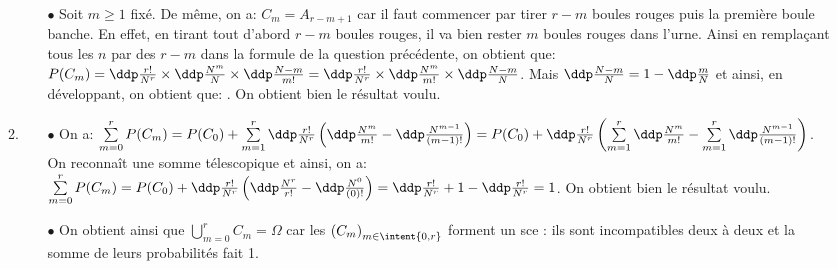 \begin{correction}
\begin{enumerate}
\begin{enumerate}
\begin{itemize}
\item[$\bullet$] Soit $m\geq 1$ fix\'e. De m\^{e}me, on a: $C_m=A_{r-m+1}$ car il faut commencer par tirer $r-m$ boules rouges puis la premi\`{e}re boule banche. En effet, en tirant tout d'abord $r-m$ boules rouges, il va bien rester $m$ boules rouges dans l'urne. Ainsi en rempla\c{c}ant tous les $n$ par des $r-m$ dans la formule de la question pr\'ec\'edente, on obtient que: 
$P(C_m)=\ddp\frac{r!}{N^r}\times \ddp\frac{N^m}{N}\times \ddp\frac{N-m}{m!}=\ddp\frac{r!}{N^r}\times \ddp\frac{N^m}{m!}\times \ddp\frac{N-m}{N}$. Mais $\ddp\frac{N-m}{N}=1-\ddp\frac{m}{N}$ et ainsi, en d\'eveloppant, on obtient que: 
. On obtient bien le r\'esultat voulu.
\end{itemize}
\item 
\begin{itemize}
\item[$\bullet$] On a: $\sum\limits_{m=0}^r P(C_m)=P(C_0)+\sum\limits_{m=1}^r \ddp\frac{r!}{N^r}\left( \ddp\frac{N^m}{m!} - \ddp\frac{N^{m-1}}{(m-1)!}   \right)=P(C_0)+ \ddp\frac{r!}{N^r} \left( \sum\limits_{m=1}^r \ddp\frac{N^m}{m!}    -\sum\limits_{m=1}^r   \ddp\frac{N^{m-1}}{(m-1)!}    \right)$. On reconna\^{i}t une somme t\'elescopique et ainsi, on a: $\sum\limits_{m=0}^r P(C_m)=P(C_0) + \ddp\frac{r!}{N^r}  \left(  \ddp\frac{N^r}{r!}-  \ddp\frac{N^{0}}{(0)!}  \right)=\ddp\frac{r!}{N^r}+1-\ddp\frac{r!}{N^r}=1$. On obtient bien le r\'esultat voulu.
\item[$\bullet$] On obtient ainsi que $\bigcup\limits_{m=0}^r C_m=\Omega$ car les $\left(  C_m\right)_{m\in\intent{ 0,r}}$ forment un sce : ils sont incompatibles deux \`{a} deux et  la somme de leurs probabilit\'es fait 1.
\end{itemize}
\end{enumerate}
\end{enumerate}
\end{correction}